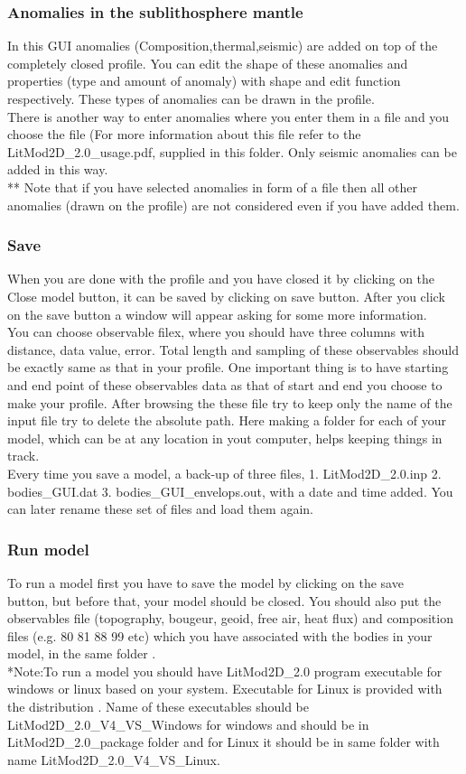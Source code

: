 \documentclass[14pt]{article}
\begin{document}
\subsubsection{Anomalies in the sublithosphere mantle}
In this GUI anomalies (Composition,thermal,seismic) are added on top of the completely closed profile. You can edit the shape of these anomalies and properties (type and amount of anomaly) with shape and edit function respectively. These types of anomalies can be drawn in the profile. \\
There is another way to enter anomalies where you enter them in a file and you choose the file (For more information about this file refer to the LitMod2D\_2.0\_usage.pdf, supplied in this folder. Only seismic anomalies can be added in this way.\\
** Note that if you have selected anomalies in form of a file then all other anomalies (drawn on the profile) are not considered even if you have added them.
\subsubsection{Save }
When you are done with the profile and you have closed it by clicking on the Close model button, it can be saved by clicking on save button. After you click on the save button a window will appear asking for some more information.\\
You can choose observable filex, where you should have three columns with distance, data value, error. Total length and sampling of these observables should be exactly same as that in your profile. One important thing is to have starting and end point of these observables data as that of start and end you choose to make your profile. After browsing the these file try to keep only the name of the input file try to delete the absolute path. Here making a folder for each of your model, which can be at any location in yout computer, helps keeping things in track.\\
Every time you save a model, a back-up of three files, 1. LitMod2D\_2.0.inp 2. bodies\_GUI.dat 3. bodies\_GUI\_envelops.out, with a date and time added. You can later rename these set of files and load them again. 

\subsubsection{Run model}

To run a model first you have to save the model by clicking on the save\\ button, but before that, your model should be closed. You should also put the observables file (topography, bougeur, geoid, free air, heat flux) and composition files (e.g. 80 81 88 99 etc) which you have associated with the bodies in your model, in the same folder .\\ 
*Note:To run a model you should have LitMod2D\_2.0 program executable for windows or linux based on your system. Executable for Linux is provided with the distribution . Name of these executables should be \\ LitMod2D\_2.0\_V4\_VS\_Windows for windows and should be in LitMod2D\_2.0\_package folder and for Linux it should be in same folder with name LitMod2D\_2.0\_V4\_VS\_Linux.
\end{document}
